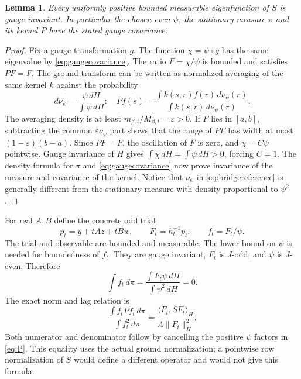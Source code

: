 \documentclass[11pt]{article}
\newtheorem{lemma}[theorem]{Lemma}
\begin{document}
\begin{lemma}\label{lem:gaugeground}
Every uniformly positive bounded measurable eigenfunction of $S$
is gauge invariant. In particular the chosen even $\psi$, the stationary
measure $\pi$ and its kernel $P$ have the stated gauge covariance.
\end{lemma}
\begin{proof}
Fix a gauge transformation $g$. The function $\chi=\psi\circ g$
has the same eigenvalue by \eqref{eq:gaugecovariance}.
The ratio $F=\chi/\psi$ is bounded and satisfies $PF=F$.
The ground transform can be written as normalized averaging of the
same kernel $k$ against the probability
\begin{equation}\label{eq:bridgereference}
 d\nu_\psi=\frac{\psi\,dH}{\int\psi\,dH}:
 \quad Pf(s)=\frac{\int k(s,r)f(r)\,d\nu_\psi(r)}
                       {\int k(s,r)\,d\nu_\psi(r)}.
\end{equation}
The averaging density is at least $m_{\beta,t}/M_{\beta,t}=\varepsilon>0$.
If $F$ lies in $[a,b]$, subtracting the common
$\varepsilon\nu_\psi$ part shows that the range of $PF$ has width
at most $(1-\varepsilon)(b-a)$. Since $PF=F$, the oscillation of $F$
is zero, and $\chi=C\psi$ pointwise. Gauge invariance of $H$ gives
$\int\chi\,dH=\int\psi\,dH>0$, forcing $C=1$.
The density formula for $\pi$ and \eqref{eq:gaugecovariance} now prove
invariance of the measure and covariance of the kernel. Notice that
$\nu_\psi$ in \eqref{eq:bridgereference} is generally different from
the stationary measure with density proportional to $\psi^2$.
\end{proof}

For real $A,B$ define the concrete odd trial
\begin{equation}\label{eq:oddtrial}
 p_t=y+tAz+tBw,\qquad F_t=h_t^{-1}p_t,
 \qquad f_t=F_t/\psi.
\end{equation}
The trial and observable are bounded and measurable. The lower bound
on $\psi$ is needed for boundedness of $f_t$. They are gauge invariant,
$F_t$ is $J$-odd, and $\psi$ is $J$-even. Therefore
\begin{equation}\label{eq:center}
 \int f_t\,d\pi=\frac{\int F_t\psi\,dH}{\int\psi^2\,dH}=0.
\end{equation}
The exact norm and lag relation is
\begin{equation}\label{eq:rayleigh}
 \frac{\int f_tPf_t\,d\pi}{\int f_t^2\,d\pi}
 =\frac{\langle F_t,SF_t\rangle_H}{\Lambda\|F_t\|_H^2}.
\end{equation}
Both numerator and denominator follow by cancelling the positive
$\psi$ factors in \eqref{eq:P}. This equality uses the actual ground
normalization; a pointwise row normalization of $S$ would define a
different operator and would not give this formula.
\end{document}
